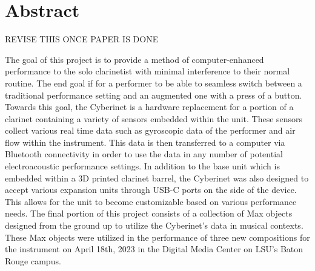 \tableofcontents









\chapter{Abstract}

REVISE THIS ONCE PAPER IS DONE

The goal of this project is to provide a method of computer-enhanced performance to the solo clarinetist with minimal interference to their normal routine. The end goal if for a performer to be able to seamless switch between a traditional performance setting and an augmented one with a press of a button. Towards this goal, the Cyberinet is a hardware replacement for a portion of a clarinet containing a variety of sensors embedded within the unit. These sensors collect various real time data such as gyroscopic data of the performer and air flow within the instrument. This data is then transferred to a computer via Bluetooth connectivity in order to use the data in any number of potential electroacoustic performance settings. In addition to the base unit which is embedded within a 3D printed clarinet barrel, the Cyberinet was also designed to accept various expansion units through USB-C ports on the side of the device. This allows for the unit to become customizable based on various performance needs. The final portion of this project consists of a collection of Max objects designed from the ground up to utilize the Cyberinet’s data in musical contexts. These Max objects were utilized in the performance of three new compositions for the instrument on April 18th, 2023 in the Digital Media Center on LSU’s Baton Rouge campus.

